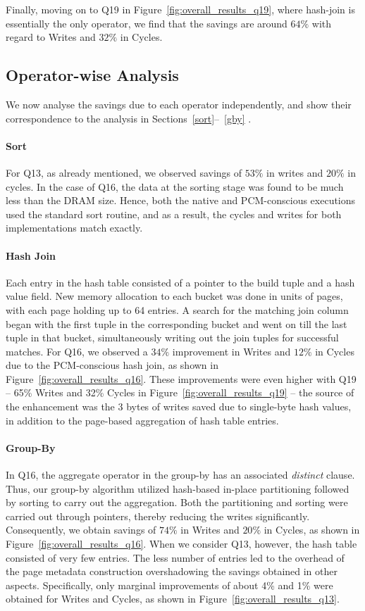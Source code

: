 Finally, moving on to Q19 in Figure~\ref{fig:overall_results_q19},
where hash-join is essentially the only operator, we find that the
savings are around $64\%$ with regard to Writes and $32\%$ in Cycles.

\subsection{Operator-wise Analysis}
We now analyse the savings due to each operator independently, and show
their correspondence to the analysis in Sections~\ref{sort}--~\ref{gby} .

\paragraph{Sort}
For Q13, as already mentioned, we observed savings of $53\%$ in writes and
$20\%$ in cycles.  In the case of Q16, the data at the sorting stage was
found to be much less than the DRAM size. Hence, both the native and
PCM-conscious executions used the standard sort routine, and as a result,
the cycles and writes for both implementations match exactly.

\paragraph{Hash Join}
Each entry in the hash table consisted of a pointer to the build tuple
and a hash value field. New memory allocation to each bucket was done
in units of pages, with each page holding up to 64 entries. A search for
the matching join column began with the first tuple in the corresponding
bucket and went on till the last tuple in that bucket, simultaneously
writing out the join tuples for successful matches.  For Q16, we
observed a $34\%$ improvement in Writes and $12\%$ in Cycles due to the
PCM-conscious hash join, as shown in Figure~\ref{fig:overall_results_q16}.
These improvements were even higher with Q19  -- 65\% Writes and 32\%
Cycles in Figure~\ref{fig:overall_results_q19} -- the source of the
enhancement was the 3 bytes of writes saved due to single-byte hash
values, in addition to the page-based aggregation of hash table entries.


\paragraph{Group-By}
In Q16, the aggregate operator in the group-by has an associated
\textit{distinct} clause.  Thus, our group-by algorithm utilized
hash-based in-place partitioning followed by sorting to carry out the
aggregation. Both the partitioning and sorting were carried out through
pointers, thereby reducing the writes significantly. Consequently,
we obtain savings of $74\%$ in Writes and $20\%$ in Cycles, as shown
in Figure~\ref{fig:overall_results_q16}.  When we consider Q13, however,
the hash table consisted of very few entries. The less number of entries
led to the overhead of the page metadata construction overshadowing the
savings obtained in other aspects. Specifically, only marginal improvements
of about 4\% and 1\% were obtained for Writes and Cycles, as shown in
Figure~\ref{fig:overall_results_q13}.

